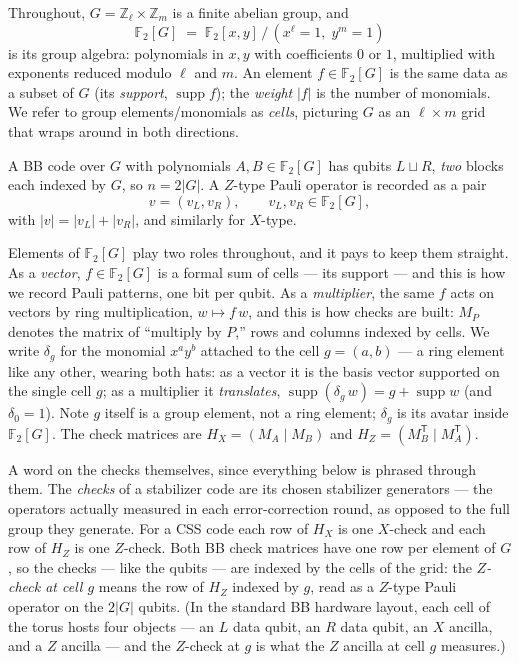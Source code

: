 \documentclass[11pt]{article}
\theoremstyle{plain}
\theoremstyle{definition}
\theoremstyle{remark}
\newcommand{\F}{\mathbb{F}}
\newcommand{\Z}{\mathbb{Z}}
\newcommand{\suppop}{\operatorname{supp}}
\newcommand{\wt}[1]{\lvert #1\rvert}
\begin{document}
Throughout, $G = \Z_\ell \times \Z_m$ is a finite abelian group, and
\[
\F_2[G] \;=\; \F_2[x,y]\,\big/\,(x^\ell = 1,\; y^m = 1)
\]
is its group algebra: polynomials in $x, y$ with coefficients $0$ or $1$,
multiplied with exponents reduced modulo $\ell$ and $m$. An element
$f \in \F_2[G]$ is the same data as a subset of $G$ (its \emph{support},
$\suppop f$); the \emph{weight} $\wt{f}$ is the number of monomials. We refer
to group elements/monomials as \emph{cells}, picturing $G$ as an
$\ell \times m$ grid that wraps around in both directions.

A BB code over $G$ with polynomials $A, B \in \F_2[G]$ has qubits
$L \sqcup R$, \emph{two} blocks each indexed by $G$, so $n = 2|G|$. A $Z$-type
Pauli operator is recorded as a pair
\[
v = (v_L, v_R), \qquad v_L, v_R \in \F_2[G],
\]
with $\wt{v} = \wt{v_L} + \wt{v_R}$, and similarly for $X$-type.

Elements of $\F_2[G]$ play two roles throughout, and it pays to keep them
straight. As a \emph{vector}, $f \in \F_2[G]$ is a formal sum of cells ---
its support --- and this is how we record Pauli patterns, one bit per qubit.
As a \emph{multiplier}, the same $f$ acts on vectors by ring multiplication,
$w \mapsto f\,w$, and this is how checks are built: $M_P$ denotes the matrix
of ``multiply by $P$,'' rows and columns indexed by cells. We write
$\delta_g$ for the monomial $x^a y^b$ attached to the cell $g = (a,b)$ ---
a ring element like any other, wearing both hats: as a vector it is the
basis vector supported on the single cell $g$; as a multiplier it
\emph{translates}, $\suppop(\delta_g\, w) = g + \suppop w$ (and $\delta_0 =
1$). Note $g$ itself is a group element, not a ring element; $\delta_g$ is
its avatar inside $\F_2[G]$. The check matrices are $H_X = (M_A \mid M_B)$
and $H_Z = (M_{B}^{\mathsf T} \mid M_{A}^{\mathsf T})$.

A word on the checks themselves, since everything below is phrased through
them. The \emph{checks} of a stabilizer code are its chosen stabilizer
generators --- the operators actually measured in each error-correction
round, as opposed to the full group they generate. For a CSS code each row
of $H_X$ is one $X$-check and each row of $H_Z$ is one $Z$-check. Both BB
check matrices have one row per element of $G$, so the checks --- like the
qubits --- are indexed by the cells of the grid: the \emph{$Z$-check at cell
$g$} means the row of $H_Z$ indexed by $g$, read as a $Z$-type Pauli
operator on the $2|G|$ qubits. (In the standard BB hardware layout, each
cell of the torus hosts four objects --- an $L$ data qubit, an $R$ data
qubit, an $X$ ancilla, and a $Z$ ancilla --- and the $Z$-check at $g$ is
what the $Z$ ancilla at cell $g$ measures.)
\end{document}
